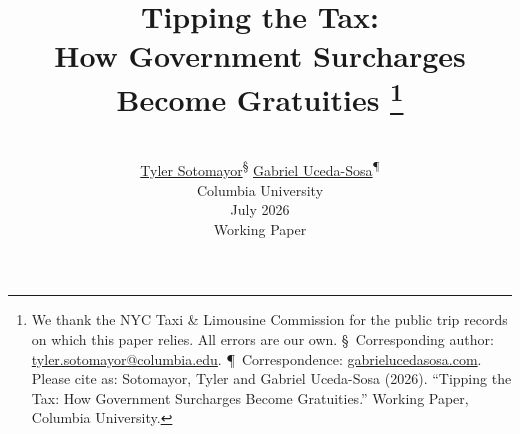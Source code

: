 \newcommand{\papermaintitle}{Tipping the Tax}
\newcommand{\papersubtitle}{How Government Surcharges Become Gratuities}
\newcommand{\paperauthorone}{Tyler Sotomayor}
\newcommand{\paperauthortwo}{Gabriel Uceda-Sosa}
\newcommand{\paperauthoroneurl}{https://tylersotomayor.com}
\newcommand{\paperauthortwourl}{https://gabrielucedasosa.com}
\newcommand{\paperauthoroneemail}{tyler.sotomayor@columbia.edu}
\newcommand{\paperauthortwoemail}{gu1245@columbia.edu}
\newcommand{\paperpreferredcitation}{%
  Sotomayor, Tyler and Gabriel Uceda-Sosa (\paperyear).
  ``\papermaintitle: \papersubtitle.''
  Working Paper, \paperinstitution.}

\newcommand{\papershorttitle}{\papermaintitle}
\newcommand{\paperdate}{July 2026}
\newcommand{\paperyear}{2026}
\newcommand{\paperinstitution}{Columbia University}
\newcommand{\paperdepartment}{Columbia University, Department of Economics}
\newcommand{\paperstatus}{Working Paper}

\title{\huge\bfseries \papermaintitle:%
  \\[0.3em] \papersubtitle%
  \thanks{We thank the NYC Taxi \& Limousine Commission for the public trip
  records on which this paper relies. All errors are our own.
  \S~Corresponding author:
  \href{mailto:\paperauthoroneemail}{\paperauthoroneemail}.
  \P~Correspondence:
  \href{\paperauthortwourl}{gabrielucedasosa.com}.
  Please cite as: \paperpreferredcitation}}

\author{%
  \vspace{-1.2em}\\
  {\Large
  \href{\paperauthoroneurl}{\paperauthorone}\textsuperscript{\S}}
  \qquad
  {\Large
  \href{\paperauthortwourl}{\paperauthortwo}\textsuperscript{\P}}
  \\[1.5em]
  {\Large \paperinstitution} \\[1.5em]
  {\normalsize \paperdate} \\[1.5em]
  {\small \paperstatus}
}

\date{\vspace{-3em}}
